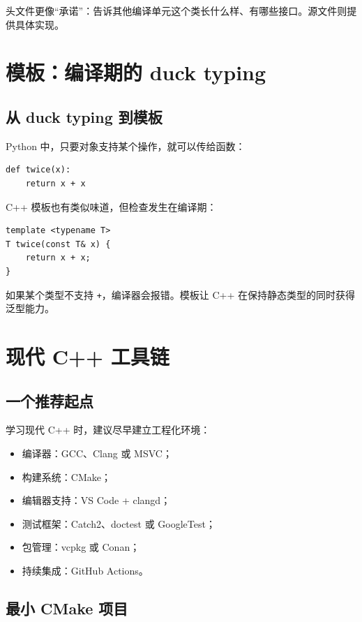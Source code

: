 \documentclass[UTF8,openany]{ctexbook}
\begin{document}
头文件更像“承诺”：告诉其他编译单元这个类长什么样、有哪些接口。源文件则提供具体实现。

\chapter{模板：编译期的 duck typing}

\section{从 duck typing 到模板}

Python 中，只要对象支持某个操作，就可以传给函数：

\begin{lstlisting}[style=pythonstyle]
def twice(x):
    return x + x
\end{lstlisting}

C++ 模板也有类似味道，但检查发生在编译期：

\begin{lstlisting}[style=cppstyle]
template <typename T>
T twice(const T& x) {
    return x + x;
}
\end{lstlisting}

如果某个类型不支持 \texttt{+}，编译器会报错。模板让 C++ 在保持静态类型的同时获得泛型能力。

\chapter{现代 C++ 工具链}

\section{一个推荐起点}

学习现代 C++ 时，建议尽早建立工程化环境：

\begin{itemize}[noitemsep]
  \item 编译器：GCC、Clang 或 MSVC；
  \item 构建系统：CMake；
  \item 编辑器支持：VS Code + clangd；
  \item 测试框架：Catch2、doctest 或 GoogleTest；
  \item 包管理：vcpkg 或 Conan；
  \item 持续集成：GitHub Actions。
\end{itemize}

\section{最小 CMake 项目}
\end{document}

